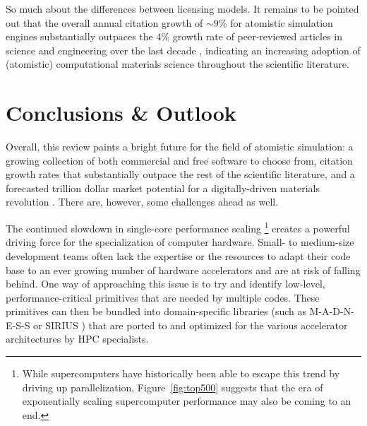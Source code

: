 \documentclass[9pt,review]{livecoms}
\begin{document}
So much about the differences between licensing models. 
It remains to be pointed out that the overall annual citation growth of ${\sim}9\%$ for atomistic simulation engines substantially outpaces the $4\%$ growth rate of peer-reviewed articles in science and engineering over the last decade \cite{citation-us}, indicating an increasing adoption of (atomistic) computational materials science throughout the scientific literature. 


\section{Conclusions \& Outlook}



Overall, this review paints a bright future for the field of atomistic simulation: 
a growing collection of both commercial and free software to choose from, citation growth rates that substantially outpace the rest of the scientific literature, and a forecasted trillion dollar market potential for a digitally-driven materials revolution \cite{Satell2019}.
There are, however, some challenges ahead as well.


The continued slowdown in single-core performance scaling%
\footnote{While supercomputers have historically been able to escape this trend by driving up parallelization, Figure~\ref{fig:top500} suggests that the era of exponentially scaling supercomputer performance may also be coming to an end.}
creates a powerful driving force for the specialization of computer hardware.
Small- to medium-size development teams often lack the expertise or the resources to adapt their code base to an ever growing number of hardware accelerators and are at risk of falling behind.
One way of approaching this issue is to try and identify low-level, performance-critical primitives that are needed by multiple codes. 
These primitives can then be bundled into domain-specific libraries (such as M-A-D-N-E-S-S \cite{Harrison2016} or SIRIUS \cite{Sirius2021}) that are ported to and optimized for the various accelerator architectures by HPC specialists.
\end{document}
